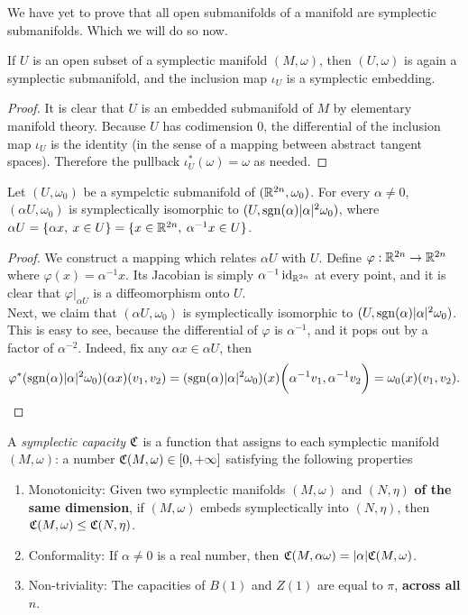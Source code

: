 \documentclass[../main-v2-manifolds.tex]{subfiles}
\begin{document}
We have yet to prove that all open submanifolds of a manifold are symplectic submanifolds. Which we will do so now.
\begin{wts}
    If $U$ is an open subset of a symplectic manifold $(M,\omega)$, then $(U,\omega)$ is again a symplectic submanifold, and the inclusion map $\iota_U$ is a symplectic embedding.
\end{wts}
\begin{proof}
    It is clear that $U$ is an embedded submanifold of $M$ by elementary manifold theory. Because $U$ has codimension $0$, the differential of the inclusion map $\iota_U$ is the identity (in the sense of a mapping between abstract tangent spaces). Therefore the pullback $\iota_U^*(\omega) = \omega$ as needed. 
\end{proof}
\begin{lemma}
    Let $(U,\omega_0)$ be a sympelctic submanifold of $({\mathbb{R}^{2n}},\omega_0)$. For every $\alpha\neq 0$, $(\alpha U,\omega_0)$ is symplectically isomorphic to $(U,\operatorname{sgn}(\alpha)\vert {\alpha} \vert^2\omega_0)$, where $\alpha U=\{\alpha x,\: x\in U\}=\{x\in{\mathbb{R}^{2n}},\: \alpha^{-1}x\in U\}$.
\end{lemma}
\begin{proof}
    We construct a mapping which relates $\alpha U$ with $U$. Define $\varphi:{\mathbb{R}^{2n}}\to{\mathbb{R}^{2n}}$ where $\varphi(x) = \alpha^{-1}x$. Its Jacobian is simply $\alpha^{-1}\operatorname{id}_{{\mathbb{R}^{2n}}}$ at every point, and it is clear that $\varphi\vert_{\alpha U}$ is a diffeomorphism onto $U$.\\

    Next, we claim that $(\alpha U,\omega_0)$ is symplectically isomorphic to $(U,\operatorname{sgn}(\alpha)\vert {\alpha} \vert^2\omega_0)$. This is easy to see, because the differential of $\varphi$ is $\alpha^{-1}$, and it pops out by a factor of $\alpha^{-2}$. Indeed, fix any $\alpha x\in \alpha U$, then 
    \[
        \varphi^*(\operatorname{sgn}(\alpha)\vert {\alpha} \vert^2\omega_0)(\alpha x)(v_1,v_2) = (\operatorname{sgn}(\alpha)\vert {\alpha} \vert^2\omega_0)(x)\biggl(\alpha^{-1}v_1, \alpha^{-1}v_2\biggr) = \omega_0(x)(v_1,v_2).
    \]
\end{proof}
\begin{definition}
    A \emph{symplectic capacity} $\mathfrak{C}$ is a function that assigns to each symplectic manifold $(M,\omega)$:  a number $\mathfrak{C}(M,\omega)\in[0,+\infty]$ satisfying the following properties
    \begin{enumerate}
        \item Monotonicity: Given two symplectic manifolds $(M,\omega)$ and $(N,\eta)$ \textbf{of the same dimension}, if $(M,\omega)$ embeds symplectically into $(N,\eta)$, then $\mathfrak{C}(M,\omega) \leq \mathfrak{C}(N,\eta)$.
        \item Conformality: If $\alpha\neq 0$ is a real number, then $\mathfrak{C}(M,\alpha\omega) = \vert {\alpha} \vert\mathfrak{C}(M,\omega)$.
        \item Non-triviality: The capacities of $B(1)$ and $Z(1)$ are equal to $\pi$, \textbf{across all $n$}.
    \end{enumerate}
\end{definition}
\end{document}
